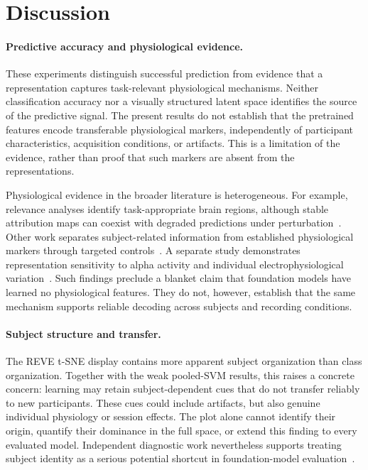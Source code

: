 \documentclass{article}
\begin{document}
\section{Discussion}
\label{sec:discussion}

\paragraph{Predictive accuracy and physiological evidence.}
These experiments distinguish successful prediction from evidence that a
representation captures task-relevant physiological mechanisms. Neither
classification accuracy nor a visually structured latent space identifies
the source of the predictive signal. The present results do not establish
that the pretrained features encode transferable physiological markers,
independently of participant characteristics, acquisition conditions, or
artifacts. This is a limitation of the evidence, rather than proof that
such markers are absent from the representations.

Physiological evidence in the broader literature is heterogeneous.
For example, relevance analyses identify task-appropriate brain
regions, although stable attribution maps can coexist with degraded
predictions under perturbation~\cite{sirca2026beyond}. Other work separates
subject-related information from established physiological markers through
targeted controls~\cite{lin2026identity}. A separate study demonstrates representation sensitivity to alpha activity
and individual electrophysiological variation~\cite{ogg2025features}.
Such findings preclude a blanket claim that foundation models have learned
no physiological features. They do not, however, establish that the same
mechanism supports reliable decoding across subjects and recording conditions.

\paragraph{Subject structure and transfer.}
The REVE t-SNE display contains more apparent subject organization than
class organization. Together with the weak pooled-SVM results, this raises
a concrete concern: learning may retain subject-dependent cues that do not
transfer reliably to new participants. These cues could include artifacts,
but also genuine individual physiology or session effects. The plot alone
cannot identify their origin, quantify their dominance in the full space,
or extend this finding to every evaluated model. Independent diagnostic
work nevertheless supports treating subject identity as a serious potential
shortcut in foundation-model evaluation~\cite{lin2026identity}.
\end{document}
